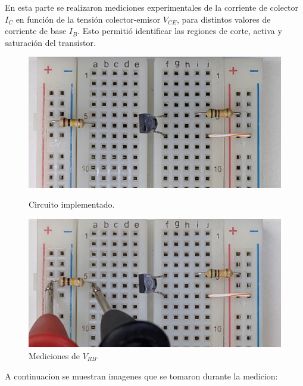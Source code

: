   En esta parte se realizaron mediciones experimentales de la corriente de colector $I_C$ en función de la tensión colector-emisor $V_{CE}$, para distintos valores de corriente de base $I_B$. Esto permitió identificar las regiones de corte, activa y saturación del transistor.

  \begin{figure}[!ht]

        \begin{minipage}{0.5\textwidth}
            \includegraphics[width=1\textwidth]{tp3/pictures/prot_crkt-2_3.jpg}
            \caption{Circuito implementado.}
 
        \end{minipage}
                    \begin{minipage}{0.5\textwidth}
            \includegraphics[width=1\textwidth]{tp3/pictures/prot_crkt-2_3_Vrb.jpg}
            \caption{Mediciones de $V_{RB}$.}

        \end{minipage}
        
 
    \end{figure}

  A continuacion se muestran imagenes que se tomaron durante la medicion:



